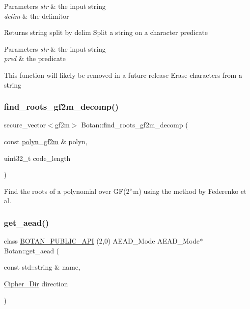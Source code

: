 \begin{DoxyParams}{Parameters}
{\em str} & the input string \\
\hline
{\em delim} & the delimitor \\
\hline
\end{DoxyParams}
\begin{DoxyReturn}{Returns}
string split by delim Split a string on a character predicate 
\end{DoxyReturn}

\begin{DoxyParams}{Parameters}
{\em str} & the input string \\
\hline
{\em pred} & the predicate\\
\hline
\end{DoxyParams}
This function will likely be removed in a future release Erase characters from a string \mbox{\label{namespace_botan_ab09a4986d871198f0b07c181de40cf51}} 
\subsubsection{\texorpdfstring{find\+\_\+roots\+\_\+gf2m\+\_\+decomp()}{find\_roots\_gf2m\_decomp()}}
{\footnotesize\ttfamily secure\+\_\+vector$<$gf2m$>$ Botan\+::find\+\_\+roots\+\_\+gf2m\+\_\+decomp (\begin{DoxyParamCaption}\item[{const \hyperlink{class_botan_1_1polyn__gf2m}{polyn\+\_\+gf2m} \&}]{polyn,  }\item[{uint32\+\_\+t}]{code\+\_\+length }\end{DoxyParamCaption})}

Find the roots of a polynomial over G\+F(2$^\wedge$m) using the method by Federenko et al. \mbox{\label{namespace_botan_a22646ab3e050b0bf8f3ec55184c467c6}} 
\subsubsection{\texorpdfstring{get\+\_\+aead()}{get\_aead()}}
{\footnotesize\ttfamily class \hyperlink{namespace_botan_a6b9388030d872e586a4655b776ac9501}{B\+O\+T\+A\+N\+\_\+\+P\+U\+B\+L\+I\+C\+\_\+\+A\+PI} (2,0) A\+E\+A\+D\+\_\+\+Mode A\+E\+A\+D\+\_\+\+Mode$\ast$ Botan\+::get\+\_\+aead (\begin{DoxyParamCaption}\item[{const std\+::string \&}]{name,  }\item[{\hyperlink{namespace_botan_a8d9547a8fb3e868810b169b20ac389ee}{Cipher\+\_\+\+Dir}}]{direction }\end{DoxyParamCaption})\hspace{0.3cm}{\ttfamily [inline]}}


